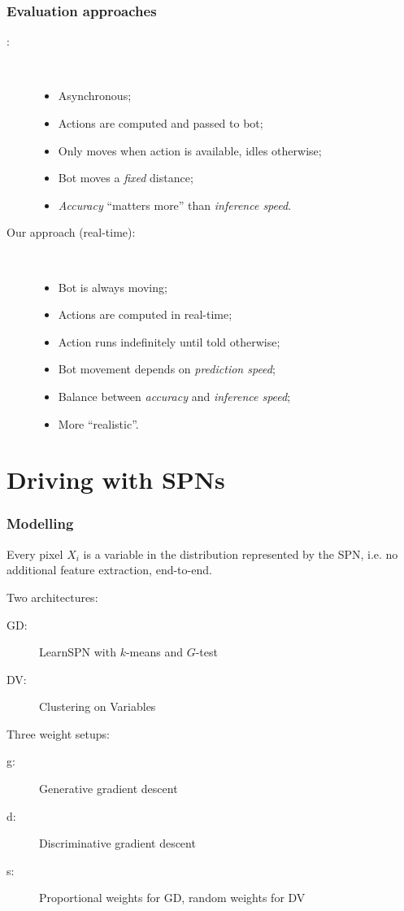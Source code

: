 \documentclass{beamer}
\begin{document}
\begin{frame}
  \frametitle{Evaluation approaches}

  \begin{description}
    \item[\cite{self-driving}:]~\\
      \begin{itemize}
        \item Asynchronous;
        \item Actions are computed and passed to bot;
        \item Only moves when action is available, idles otherwise;
        \item Bot moves a \emph{fixed} distance;
        \item \emph{Accuracy} ``matters more'' than \emph{inference speed}.
      \end{itemize}
    \item[Our approach (real-time):]~\\
      \begin{itemize}
        \item Bot is always moving;
        \item Actions are computed in real-time;
        \item Action runs indefinitely until told otherwise;
        \item Bot movement depends on \emph{prediction speed};
        \item Balance between \emph{accuracy} and \emph{inference speed};
        \item More ``realistic''.
      \end{itemize}
  \end{description}
\end{frame}

\section{Driving with SPNs}

\begin{frame}
  \frametitle{Modelling}

  Every pixel $X_i$ is a variable in the distribution represented by the SPN, i.e. no additional
  feature extraction, end-to-end.

  Two architectures:
  \begin{description}
    \item[GD:] LearnSPN with $k$-means and $G$-test
    \item[DV:] Clustering on Variables
  \end{description}
  Three weight setups:
  \begin{description}
    \item[g:] Generative gradient descent
    \item[d:] Discriminative gradient descent
    \item[s:] Proportional weights for GD, random weights for DV
  \end{description}
\end{frame}
\end{document}

